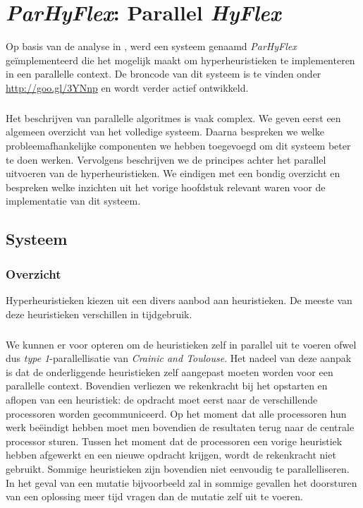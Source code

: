 \chapter{\emph{ParHyFlex}: Parallel \emph{HyFlex}}


Op basis van de analyse in , werd een systeem genaamd \emph{ParHyFlex} ge\"implementeerd die het mogelijk maakt om hyperheuristieken te implementeren in een parallelle context. De broncode van dit systeem is te vinden onder \mbox{\url{http://goo.gl/3YNnp}} en wordt verder actief ontwikkeld.
\paragraph{}
Het beschrijven van parallelle algoritmes is vaak complex. We geven eerst een algemeen overzicht van het volledige systeem. Daarna bespreken we welke probleemafhankelijke componenten we hebben toegevoegd om dit systeem beter te doen werken. Vervolgens beschrijven we de principes achter het parallel uitvoeren van de hyperheuristieken. We eindigen met een bondig overzicht en bespreken welke inzichten uit het vorige hoofdstuk relevant waren voor de implementatie van dit systeem.

\section{Systeem}

\subsection{Overzicht}

Hyperheuristieken kiezen uit een divers aanbod aan heuristieken. De meeste van deze heuristieken verschillen in tijdgebruik.

\paragraph{}
We kunnen er voor opteren om de heuristieken zelf in parallel uit te voeren ofwel dus \emph{type 1}-parallellisatie van \emph{Crainic and Toulouse}\cite{crainicAndToulouse}. Het nadeel van deze aanpak is dat de onderliggende heuristieken zelf aangepast moeten worden voor een parallelle context. Bovendien verliezen we rekenkracht bij het opstarten en aflopen van een heuristiek: de opdracht moet eerst naar de verschillende processoren worden gecommuniceerd. Op het moment dat alle processoren hun werk be\"eindigt hebben moet men bovendien de resultaten terug naar de centrale processor sturen. Tussen het moment dat de processoren een vorige heuristiek hebben afgewerkt en een nieuwe opdracht krijgen, wordt de rekenkracht niet gebruikt. Sommige heuristieken zijn bovendien niet eenvoudig te parallelliseren. In het geval van een mutatie bijvoorbeeld zal in sommige gevallen het doorsturen van een oplossing meer tijd vragen dan de mutatie zelf uit te voeren.

